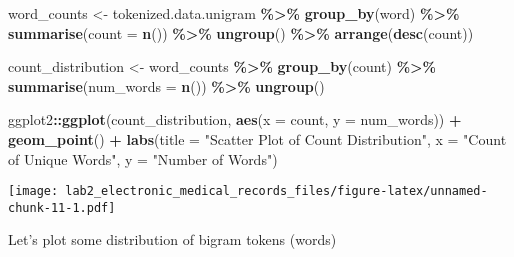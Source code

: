 \documentclass[
]{article}
\newenvironment{Shaded}{\begin{snugshade}}{\end{snugshade}}
\newcommand{\AttributeTok}[1]{\textcolor[rgb]{0.13,0.29,0.53}{#1}}
\newcommand{\FunctionTok}[1]{\textcolor[rgb]{0.13,0.29,0.53}{\textbf{#1}}}
\newcommand{\NormalTok}[1]{#1}
\newcommand{\OtherTok}[1]{\textcolor[rgb]{0.56,0.35,0.01}{#1}}
\newcommand{\SpecialCharTok}[1]{\textcolor[rgb]{0.81,0.36,0.00}{\textbf{#1}}}
\newcommand{\StringTok}[1]{\textcolor[rgb]{0.31,0.60,0.02}{#1}}
\begin{document}
\begin{Shaded}
\begin{Highlighting}[]
\NormalTok{word\_counts }\OtherTok{\textless{}{-}}\NormalTok{ tokenized.data.unigram }\SpecialCharTok{\%\textgreater{}\%}
    \FunctionTok{group\_by}\NormalTok{(word) }\SpecialCharTok{\%\textgreater{}\%}
    \FunctionTok{summarise}\NormalTok{(}\AttributeTok{count =} \FunctionTok{n}\NormalTok{()) }\SpecialCharTok{\%\textgreater{}\%}
    \FunctionTok{ungroup}\NormalTok{() }\SpecialCharTok{\%\textgreater{}\%}
    \FunctionTok{arrange}\NormalTok{(}\FunctionTok{desc}\NormalTok{(count))}

\NormalTok{count\_distribution }\OtherTok{\textless{}{-}}\NormalTok{ word\_counts }\SpecialCharTok{\%\textgreater{}\%}
  \FunctionTok{group\_by}\NormalTok{(count) }\SpecialCharTok{\%\textgreater{}\%}
  \FunctionTok{summarise}\NormalTok{(}\AttributeTok{num\_words =} \FunctionTok{n}\NormalTok{()) }\SpecialCharTok{\%\textgreater{}\%}
  \FunctionTok{ungroup}\NormalTok{()}
 
\NormalTok{ ggplot2}\SpecialCharTok{::}\FunctionTok{ggplot}\NormalTok{(count\_distribution, }\FunctionTok{aes}\NormalTok{(}\AttributeTok{x =}\NormalTok{ count, }\AttributeTok{y =}\NormalTok{ num\_words)) }\SpecialCharTok{+}
  \FunctionTok{geom\_point}\NormalTok{() }\SpecialCharTok{+}
  \FunctionTok{labs}\NormalTok{(}\AttributeTok{title =} \StringTok{"Scatter Plot of Count Distribution"}\NormalTok{,}
       \AttributeTok{x =} \StringTok{"Count of Unique Words"}\NormalTok{,}
       \AttributeTok{y =} \StringTok{"Number of Words"}\NormalTok{)}
\end{Highlighting}
\end{Shaded}

\texttt{[image: lab2\_electronic\_medical\_records\_files/figure-latex/unnamed-chunk-11-1.pdf]}

Let's plot some distribution of bigram tokens (words)
\end{document}
